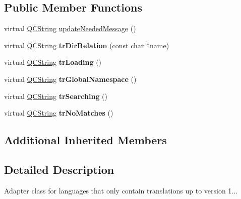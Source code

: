 \subsection*{Public Member Functions}
\begin{DoxyCompactItemize}
\item 
virtual \mbox{\hyperlink{class_q_c_string}{Q\+C\+String}} \mbox{\hyperlink{class_translator_adapter__1__6__0_abc231eb2c1864ca9f878e7e5deb94f54}{update\+Needed\+Message}} ()
\item 
\mbox{\label{class_translator_adapter__1__6__0_abe5f4a20e765b43baab350e095a2ffbc}} 
virtual \mbox{\hyperlink{class_q_c_string}{Q\+C\+String}} {\bfseries tr\+Dir\+Relation} (const char $\ast$name)
\item 
\mbox{\label{class_translator_adapter__1__6__0_a86b196c04e1772acf373795d25ee86b1}} 
virtual \mbox{\hyperlink{class_q_c_string}{Q\+C\+String}} {\bfseries tr\+Loading} ()
\item 
\mbox{\label{class_translator_adapter__1__6__0_afd249bfd8e208252314ed10403031695}} 
virtual \mbox{\hyperlink{class_q_c_string}{Q\+C\+String}} {\bfseries tr\+Global\+Namespace} ()
\item 
\mbox{\label{class_translator_adapter__1__6__0_abfbe315313de7a800c2cfb3d860d458d}} 
virtual \mbox{\hyperlink{class_q_c_string}{Q\+C\+String}} {\bfseries tr\+Searching} ()
\item 
\mbox{\label{class_translator_adapter__1__6__0_a984d8dc682c49badea360ea70756a928}} 
virtual \mbox{\hyperlink{class_q_c_string}{Q\+C\+String}} {\bfseries tr\+No\+Matches} ()
\end{DoxyCompactItemize}
\subsection*{Additional Inherited Members}


\subsection{Detailed Description}
Adapter class for languages that only contain translations up to version 1... 

